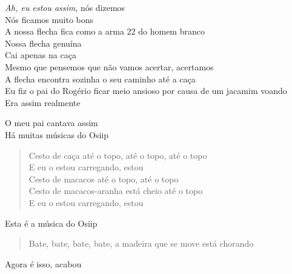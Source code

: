\bigskip

\begin{linenumbers}\begingroup\raggedright
 
\noindent \emph{Ah, eu estou assim}, nós dizemos\\
  Nós ficamos muito bons\\
  A nossa flecha fica como a arma 22 do homem branco\\
  Nossa flecha genuína\\
  Cai apenas na caça\\
  Mesmo que pensemos que não vamos acertar, acertamos\\
  A flecha encontra sozinha o seu caminho até a caça\\
  Eu fiz o pai do Rogério ficar meio ansioso por causa de um jacamim voando\\
  Era assim realmente
 
\end{linenumbers}\endgroup

\bigskip

\begin{linenumbers}\begingroup\raggedright
 
 \noindent O meu pai cantava assim\\
 Há muitas músicas do Osiip
 \begin{quote}
 Cesto de caça até o topo, até o topo, até o topo\\
 E eu o estou carregando, estou \\
 Cesto de macacos até o topo, até o topo\\
 Cesto de macacos-aranha está cheio até o topo\\
 E eu o estou carregando, estou
 \end{quote}
 \noindent Esta é a música do Osiip
 \begin{quote}
 Bate, bate, bate, bate, a madeira que se move está chorando
 \end{quote}
 \noindent Agora é isso, acabou
 
\end{linenumbers}\endgroup

